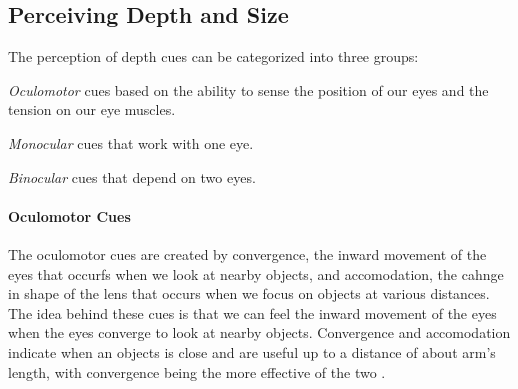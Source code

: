 \subsection{Perceiving Depth and Size}
The perception of depth cues can be categorized into three groups:
\begin{my_list_num}
	\item
		\emph{Oculomotor} cues based on the ability to sense the position of our eyes and the tension on our eye muscles.
	\item
		\emph{Monocular} cues that work with one eye.
	\item
		\emph{Binocular} cues that depend on two eyes.
\end{my_list_num}

\paragraph{Oculomotor Cues}
The oculomotor cues are created by convergence, the inward movement of the eyes that occurfs when we look at nearby objects, and accomodation, the cahnge in shape of the lens that occurs when we focus on objects at various distances.
The idea behind these cues is that we can feel the inward movement of the eyes when the eyes converge to look at nearby objects.
Convergence and accomodation indicate when an objects is close and are useful up to a distance of about arm's length, with convergence being the more effective of the two \cite{Mon-Williams:1999:ExtraretinalContribution, Tresilian:1999:Vergence}.

